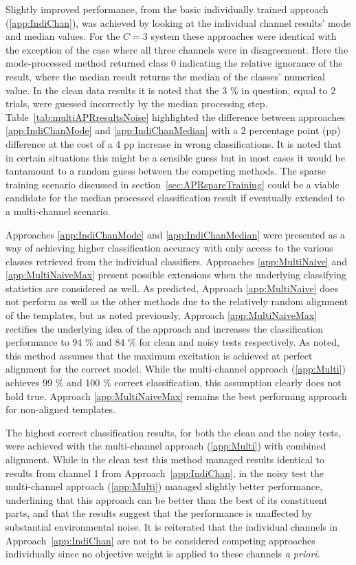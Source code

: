 Slightly improved performance, from the basic individually trained approach (\ref{app:IndiChan}), was achieved by looking at the individual channel results' mode and median values. For the $C=3$ system these approaches were identical with the exception of the case where all three channels were in disagreement. Here the mode-processed method returned class 0 indicating the relative ignorance of the result, where the median result returns the median of the classes' numerical value. In the clean data results it is noted that the 3 \% in question, equal to 2 trials, were guessed incorrectly by the median processing step. Table~\ref{tab:multiAPRresultsNoise} highlighted the difference between approaches \ref{app:IndiChanMode} and \ref{app:IndiChanMedian} with a 2 percentage point (pp) difference at the cost of a 4 pp increase in wrong classifications. It is noted that in certain situations this might be a sensible guess but in most cases it would be tantamount to a random guess between the competing methods. The sparse training scenario discussed in section~\ref{sec:APRspareTraining} could be a viable candidate for the median processed classification result if eventually extended to a multi-channel scenario.

Approaches \ref{app:IndiChanMode} and \ref{app:IndiChanMedian} were presented as a way of achieving higher classification accuracy with only access to the various classes retrieved from the individual classifiers. Approaches \ref{app:MultiNaive} and \ref{app:MultiNaiveMax} present possible extensions when the underlying classifying statistics are considered as well. As predicted, Approach \ref{app:MultiNaive} does not perform as well as the other methods due to the relatively random alignment of the templates, but as noted previously, Approach \ref{app:MultiNaiveMax} rectifies the underlying idea of the approach and increases the classification performance to 94 \% and 84 \% for clean and noisy tests respectively. As noted, this method assumes that the maximum excitation is achieved at perfect alignment for the correct model. While the multi-channel approach (\ref{app:Multi}) achieves 99 \% and 100 \% correct classification, this assumption clearly does not hold true. Approach \ref{app:MultiNaiveMax} remains the best performing approach for non-aligned templates.

The highest correct classification results, for both the clean and the noisy tests, were achieved with the multi-channel approach (\ref{app:Multi}) with combined alignment. While in the clean test this method managed results identical to results from channel 1 from Approach~\ref{app:IndiChan}, in the noisy test the multi-channel approach (\ref{app:Multi}) managed slightly better performance, underlining that this approach can be better than the best of its constituent parts, and that the results suggest that the performance is unaffected by substantial environmental noise. It is reiterated that the individual channels in Approach~\ref{app:IndiChan} are not to be considered competing approaches individually since no objective weight is applied to these channels \emph{a priori}.


